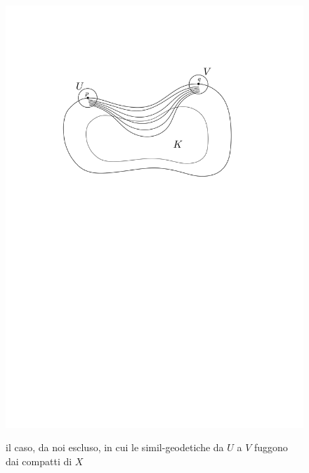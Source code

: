 \begin{figure}[h!]
    \begin{center}
        \includegraphics[width=1.05\textwidth, trim=0 18cm 0 5cm]{Immagini/nonvis.png} \\
        \caption{il caso, da noi escluso, in cui le simil-geodetiche da $U$ a $V$ fuggono dai compatti di $X$}
    \end{center}
\end{figure}
\newpage
